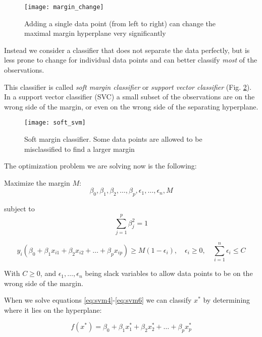 \begin{figure}[H]
	\centering
	\texttt{[image: margin\_change]}
	\caption{Adding a single data point (from left to right) can change the maximal margin hyperplane very significantly \cite{ISLR}}
	\label{fig:margin_change}
\end{figure}

Instead we consider a classifier that does not separate the data perfectly, but is less prone to change for individual data points and can better classify \textit{most} of the observations.

This classifier is called \textit{soft margin classifier} or \textit{support vector classifier} (Fig. \ref{fig:soft_svm}). \\
In a support vector classifier (SVC) a small subset of the observations are on the wrong side of the margin, or even on the wrong side of the separating hyperplane.

\begin{figure}[H]
	\centering
	\texttt{[image: soft\_svm]}
	\caption{Soft margin classifier. Some data points are allowed to be misclassified to find a larger margin \cite{soft_svm}}
	\label{fig:soft_svm}
\end{figure}

The optimization problem we are solving now is the following: 

Maximize the margin $M$:
\begin{equation} \label{eq:svm4}
	\beta_0, \beta_1, \beta_2, \dots, \beta_p, \epsilon_1, \dots, \epsilon_n, M
\end{equation}

subject to
\begin{equation} \label{eq:svm5}
	\sum_{j=1}^{p}\beta^2_j = 1
\end{equation}

\begin{equation} \label{eq:svm6}
	y_i(\beta_0 + \beta_1 x_{i1} + \beta_2 x_{i2} + \dots + \beta_p x_{ip}) \ge M(1 - \epsilon_i), \quad \epsilon_i \ge 0, \quad \sum_{i=1}^{n}\epsilon_i \le C
\end{equation}

With $C \ge 0$, and $\epsilon_1, \dots, \epsilon_n$ being slack variables to allow data points to be on the wrong side of the margin.

When we solve equations \ref{eq:svm4}-\ref{eq:svm6} we can classify $x^*$ by determining where it lies on the hyperplane:

\begin{equation} \label{eq:svm7}
	f(x^*) = \beta_0 + \beta_1 x_{1}^* + \beta_2 x_{2}^* + \dots + \beta_p x_{p}^*
\end{equation}


